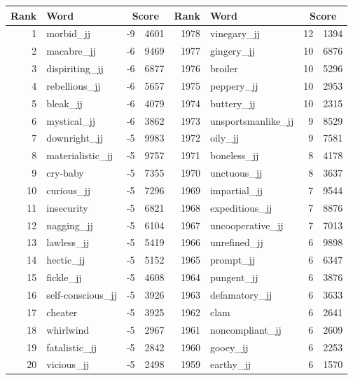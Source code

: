 \begin{table}[tbp]
    \begin{tabular}{| rlr@{.}l | rlr@{.}l |}
    \hline
    \textbf{Rank} & \textbf{Word} & \multicolumn{2}{c|}{\textbf{Score}} & \textbf{Rank} & \textbf{Word} & \multicolumn{2}{c|}{\textbf{Score}} \\
    \hline
    1 & morbid\_jj & -9 & 4601    &    1978 & vinegary\_jj & 12 & 1394 \\
    2 & macabre\_jj & -6 & 9469    &    1977 & gingery\_jj & 10 & 6876 \\
    3 & dispiriting\_jj & -6 & 6877    &    1976 & broiler & 10 & 5296 \\
    4 & rebellious\_jj & -6 & 5657    &    1975 & peppery\_jj & 10 & 2953 \\
    5 & bleak\_jj & -6 & 4079    &    1974 & buttery\_jj & 10 & 2315 \\
    6 & mystical\_jj & -6 & 3862    &    1973 & unsportsmanlike\_jj & 9 & 8529 \\
    7 & downright\_jj & -5 & 9983    &    1972 & oily\_jj & 9 & 7581 \\
    8 & materialistic\_jj & -5 & 9757    &    1971 & boneless\_jj & 8 & 4178 \\
    9 & cry-baby & -5 & 7355    &    1970 & unctuous\_jj & 8 & 3637 \\
    10 & curious\_jj & -5 & 7296    &    1969 & impartial\_jj & 7 & 9544 \\
    11 & insecurity & -5 & 6821    &    1968 & expeditious\_jj & 7 & 8876 \\
    12 & nagging\_jj & -5 & 6104    &    1967 & uncooperative\_jj & 7 & 7013 \\
    13 & lawless\_jj & -5 & 5419    &    1966 & unrefined\_jj & 6 & 9898 \\
    14 & hectic\_jj & -5 & 5152    &    1965 & prompt\_jj & 6 & 6347 \\
    15 & fickle\_jj & -5 & 4608    &    1964 & pungent\_jj & 6 & 3876 \\
    16 & self-conscious\_jj & -5 & 3926    &    1963 & defamatory\_jj & 6 & 3633 \\
    17 & cheater & -5 & 3925    &    1962 & clam & 6 & 2641 \\
    18 & whirlwind & -5 & 2967    &    1961 & noncompliant\_jj & 6 & 2609 \\
    19 & fatalistic\_jj & -5 & 2842    &    1960 & gooey\_jj & 6 & 2253 \\
    20 & vicious\_jj & -5 & 2498    &    1959 & earthy\_jj & 6 & 1570 \\

\end{tabular}
\end{table}
